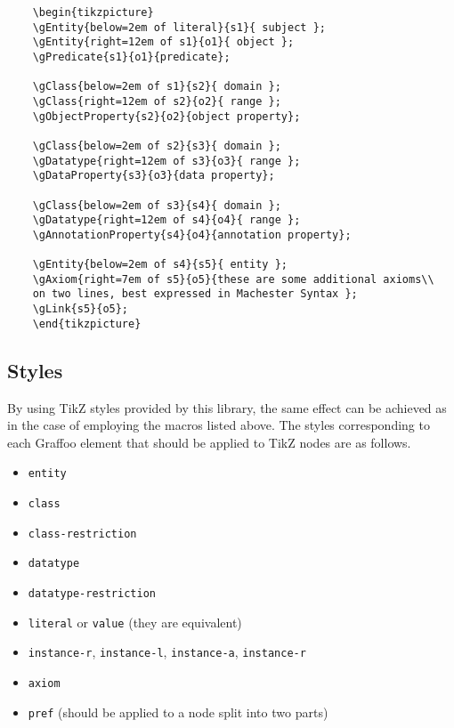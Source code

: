\documentclass[11pt,a4paper,final,oneside,onecolumn]{article}
\begin{document}
	\begin{verbatim}
	\begin{tikzpicture}
	\gEntity{below=2em of literal}{s1}{ subject };
	\gEntity{right=12em of s1}{o1}{ object };
	\gPredicate{s1}{o1}{predicate};
	
	\gClass{below=2em of s1}{s2}{ domain };
	\gClass{right=12em of s2}{o2}{ range };
	\gObjectProperty{s2}{o2}{object property};
	
	\gClass{below=2em of s2}{s3}{ domain };
	\gDatatype{right=12em of s3}{o3}{ range };
	\gDataProperty{s3}{o3}{data property};
	
	\gClass{below=2em of s3}{s4}{ domain };
	\gDatatype{right=12em of s4}{o4}{ range };
	\gAnnotationProperty{s4}{o4}{annotation property};
	
	\gEntity{below=2em of s4}{s5}{ entity };
	\gAxiom{right=7em of s5}{o5}{these are some additional axioms\\
	on two lines, best expressed in Machester Syntax };
	\gLink{s5}{o5};	
	\end{tikzpicture}
	\end{verbatim}
	
	
	\subsection{Styles}
	
	By using TikZ styles provided by this library, the same effect can be achieved as in the case of employing the macros listed above. The styles corresponding to each Graffoo element that should be applied to TikZ nodes are as follows.
	
	\begin{itemize}
		\item \texttt{entity}
		\item \texttt{class}
		\item \texttt{class-restriction}
		\item \texttt{datatype}
		\item \texttt{datatype-restriction}
		\item \texttt{literal} or \texttt{value} (they are equivalent)
		\item \texttt{instance-r}, \texttt{instance-l}, \texttt{instance-a}, \texttt{instance-r}
		\item \texttt{axiom}
		\item \texttt{pref} (should be applied to a node split into two parts)	
	\end{itemize}
	
\end{document}
